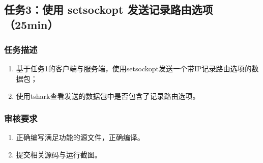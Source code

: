 \documentclass{article}
\begin{document}
\newpage
\subsection{任务3：使用 setsockopt 发送记录路由选项（25min）}

\subsubsection{任务描述}
\begin{enumerate}
    \item 基于任务1的客户端与服务端，使用setsockopt发送一个带IP记录路由选项的数据包；
    \item 使用tshark查看发送的数据包中是否包含了记录路由选项。

\end{enumerate}

\subsubsection{审核要求}
\begin{enumerate}
    \item 正确编写满足功能的源文件，正确编译。
    \item 提交相关源码与运行截图。
\end{enumerate}
\end{document}
